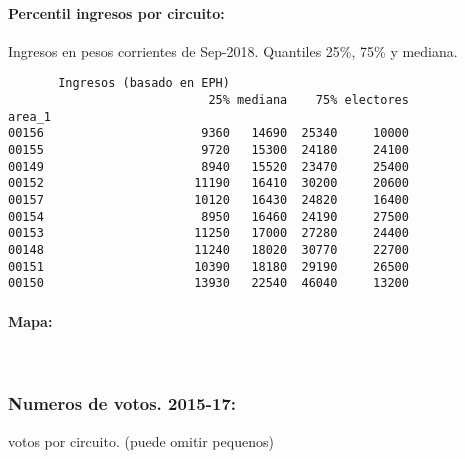\documentclass[11pt]{article}
\begin{document}
    \hypertarget{percentil-ingresos-por-circuito}{%
\paragraph{Percentil ingresos por
circuito:}\label{percentil-ingresos-por-circuito}}

    
    Ingresos en pesos corrientes de Sep-2018. Quantiles 25\%, 75\% y
mediana.

    
    
    \begin{verbatim}
       Ingresos (basado en EPH)                         
                            25% mediana    75% electores
area_1                                                  
00156                      9360   14690  25340     10000
00155                      9720   15300  24180     24100
00149                      8940   15520  23470     25400
00152                     11190   16410  30200     20600
00157                     10120   16430  24820     16400
00154                      8950   16460  24190     27500
00153                     11250   17000  27280     24400
00148                     11240   18020  30770     22700
00151                     10390   18180  29190     26500
00150                     13930   22540  46040     13200
    \end{verbatim}

    
    \hypertarget{mapa}{%
\paragraph{Mapa:}\label{mapa}}

    
    \begin{center}
    \end{center}
    { \hspace*{\fill} \\}
    
    \hypertarget{numeros-de-votos.-2015-17}{%
\subsubsection{Numeros de votos.
2015-17:}\label{numeros-de-votos.-2015-17}}

    
    votos por circuito. (puede omitir pequenos)

    
    
\end{document}
